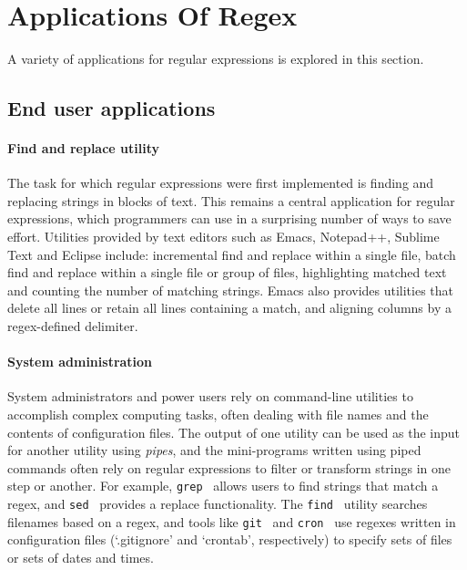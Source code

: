 \section{Applications Of Regex}
\label{sec:applications}
A variety of applications for regular expressions is explored in this section.

\subsection{End user applications}
\paragraph{Find and replace utility}  The task for which regular expressions were first implemented is finding and replacing strings in blocks of text.  This remains a central application for regular expressions, which programmers can use in a surprising number of ways to save effort.  Utilities provided by text editors such as Emacs, Notepad++, Sublime Text and Eclipse include: incremental find and replace within a single file, batch find and replace within a single file or group of files, highlighting matched text and counting the number of matching strings.  Emacs also provides utilities that delete all lines or retain all lines containing a match, and aligning columns by a regex-defined delimiter.

\paragraph{System administration}  System administrators and power users rely on command-line utilities to accomplish complex computing tasks, often dealing with file names and the contents of configuration files.  The output of one utility can be used as the input for another utility using \emph{pipes}, and the mini-programs written using piped commands often rely on regular expressions to filter or transform strings in one step or another.  For example, {\tt grep}~\citep{grepManual} allows users to find strings that match a regex, and {\tt sed}~\citep{sedManual} provides a replace functionality.  The {\tt find}~\citep{findManual} utility searches filenames based on a regex, and tools like {\tt git}~\citep{gitManual} and {\tt cron}~\citep{cronManual} use regexes written in configuration files (`.gitignore' and `crontab', respectively) to specify sets of files or sets of dates and times.

